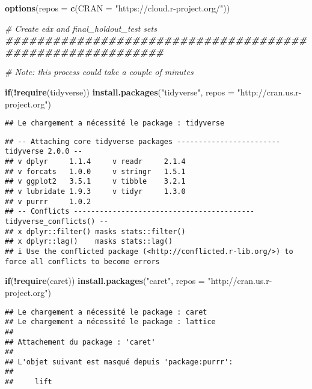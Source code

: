 \documentclass[
]{article}
\newenvironment{Shaded}{\begin{snugshade}}{\end{snugshade}}
\newcommand{\AttributeTok}[1]{\textcolor[rgb]{0.13,0.29,0.53}{#1}}
\newcommand{\CommentTok}[1]{\textcolor[rgb]{0.56,0.35,0.01}{\textit{#1}}}
\newcommand{\ControlFlowTok}[1]{\textcolor[rgb]{0.13,0.29,0.53}{\textbf{#1}}}
\newcommand{\DocumentationTok}[1]{\textcolor[rgb]{0.56,0.35,0.01}{\textbf{\textit{#1}}}}
\newcommand{\FunctionTok}[1]{\textcolor[rgb]{0.13,0.29,0.53}{\textbf{#1}}}
\newcommand{\NormalTok}[1]{#1}
\newcommand{\SpecialCharTok}[1]{\textcolor[rgb]{0.81,0.36,0.00}{\textbf{#1}}}
\newcommand{\StringTok}[1]{\textcolor[rgb]{0.31,0.60,0.02}{#1}}
\begin{document}
\begin{Shaded}
\begin{Highlighting}[]
\FunctionTok{options}\NormalTok{(}\AttributeTok{repos =} \FunctionTok{c}\NormalTok{(}\AttributeTok{CRAN =} \StringTok{"https://cloud.r{-}project.org/"}\NormalTok{))}

\CommentTok{\# Create edx and final\_holdout\_test sets}
\DocumentationTok{\#\#\#\#\#\#\#\#\#\#\#\#\#\#\#\#\#\#\#\#\#\#\#\#\#\#\#\#\#\#\#\#\#\#\#\#\#\#\#\#\#\#\#\#\#\#\#\#\#\#\#\#\#\#\#\#\#\#}

\CommentTok{\# Note: this process could take a couple of minutes}

\ControlFlowTok{if}\NormalTok{(}\SpecialCharTok{!}\FunctionTok{require}\NormalTok{(tidyverse)) }\FunctionTok{install.packages}\NormalTok{(}\StringTok{"tidyverse"}\NormalTok{, }\AttributeTok{repos =} \StringTok{"http://cran.us.r{-}project.org"}\NormalTok{)}
\end{Highlighting}
\end{Shaded}

\begin{verbatim}
## Le chargement a nécessité le package : tidyverse
\end{verbatim}

\begin{verbatim}
## -- Attaching core tidyverse packages ------------------------ tidyverse 2.0.0 --
## v dplyr     1.1.4     v readr     2.1.4
## v forcats   1.0.0     v stringr   1.5.1
## v ggplot2   3.5.1     v tibble    3.2.1
## v lubridate 1.9.3     v tidyr     1.3.0
## v purrr     1.0.2     
## -- Conflicts ------------------------------------------ tidyverse_conflicts() --
## x dplyr::filter() masks stats::filter()
## x dplyr::lag()    masks stats::lag()
## i Use the conflicted package (<http://conflicted.r-lib.org/>) to force all conflicts to become errors
\end{verbatim}

\begin{Shaded}
\begin{Highlighting}[]
\ControlFlowTok{if}\NormalTok{(}\SpecialCharTok{!}\FunctionTok{require}\NormalTok{(caret)) }\FunctionTok{install.packages}\NormalTok{(}\StringTok{"caret"}\NormalTok{, }\AttributeTok{repos =} \StringTok{"http://cran.us.r{-}project.org"}\NormalTok{)}
\end{Highlighting}
\end{Shaded}

\begin{verbatim}
## Le chargement a nécessité le package : caret
## Le chargement a nécessité le package : lattice
## 
## Attachement du package : 'caret'
## 
## L'objet suivant est masqué depuis 'package:purrr':
## 
##     lift
\end{verbatim}
\end{document}
